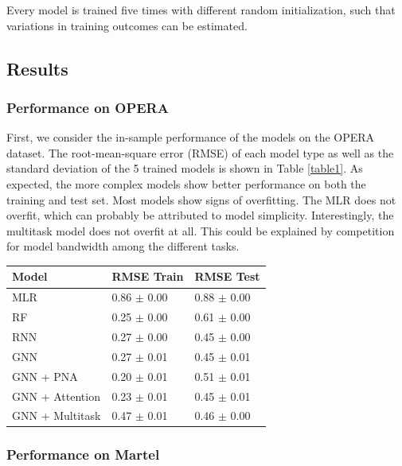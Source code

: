 \documentclass{article}
\theoremstyle{definition}
\theoremstyle{remark}
\begin{document}
Every model is trained five times with different random initialization, such that variations in training outcomes can be estimated.

\subsection{Results}

\subsubsection{Performance on OPERA}

First, we consider the in-sample performance of the models on the OPERA dataset. The root-mean-square error (RMSE) of each model type as well as the standard deviation of the 5 trained models is shown in Table \ref{table1}. As expected, the more complex models show better performance on both the training and test set. Most models show signs of overfitting. The MLR does not overfit, which can probably be attributed to model simplicity. Interestingly, the multitask model does not overfit at all. This could be explained by competition for model bandwidth among the different tasks.

\begin{center}
\begin{tabular}{ | m{3cm} | m{2.5cm}| m{2.5cm} | } 
  \hline
  \textbf{Model} & \textbf{RMSE Train} & \textbf{RMSE Test} \\ 
  \hline
  MLR & 0.86 $\pm$ 0.00 & 0.88 $\pm$ 0.00 \\ 
  \hline
  RF & 0.25 $\pm$ 0.00 & 0.61 $\pm$ 0.00 \\ 
  \hline
  RNN & 0.27 $\pm$ 0.00 & 0.45 $\pm$ 0.00 \\ 
  \hline
  GNN & 0.27 $\pm$ 0.01 & 0.45 $\pm$ 0.01 \\ 
  \hline
  GNN + PNA & 0.20 $\pm$ 0.01 & 0.51 $\pm$ 0.01 \\ 
  \hline
  GNN + Attention & 0.23 $\pm$ 0.01 & 0.45 $\pm$ 0.01 \\ 
  \hline
  GNN + Multitask & 0.47 $\pm$ 0.01 & 0.46 $\pm$ 0.00 \\ 
  \hline
\end{tabular}
\captionsetup{width=0.8\textwidth}
\label{table1}
\end{center}

\subsubsection{Performance on Martel}
\end{document}
